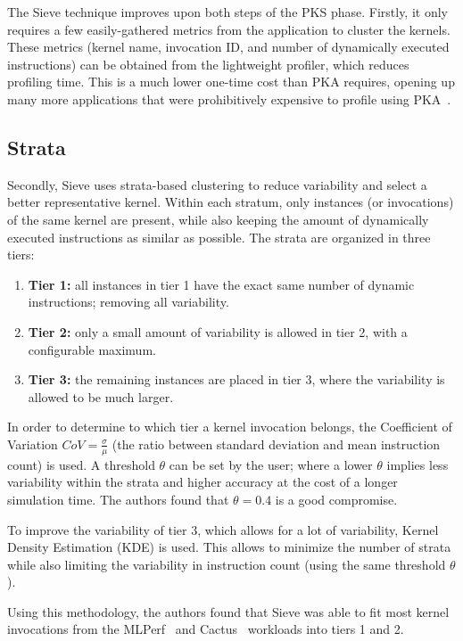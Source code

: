 The Sieve technique improves upon both steps of the PKS phase.
Firstly, it only requires a few easily-gathered metrics from the application to cluster the kernels.
These metrics (kernel name, invocation ID, and number of dynamically executed instructions) can be obtained from the lightweight profiler, which reduces profiling time.
This is a much lower one-time cost than PKA requires, opening up many more applications that were prohibitively expensive to profile using PKA\ .

\subsection{Strata}\label{subsec:strata}
Secondly, Sieve uses strata-based clustering to reduce variability and select a better representative kernel.
Within each stratum, only instances (or invocations) of the same kernel are present, while also keeping the amount of dynamically executed instructions as similar as possible.
The strata are organized in three tiers:
\begin{enumerate}
    \item \textbf{Tier 1:} all instances in tier 1 have the exact same number of dynamic instructions; removing all variability.
    \item \textbf{Tier 2:} only a small amount of variability is allowed in tier 2, with a configurable maximum.
    \item \textbf{Tier 3:} the remaining instances are placed in tier 3, where the variability is allowed to be much larger.
\end{enumerate}
In order to determine to which tier a kernel invocation belongs, the Coefficient of Variation $CoV = \frac{\sigma}{\mu}$ (the ratio between standard deviation and mean instruction count) is used.
A threshold $\theta$ can be set by the user; where a lower $\theta$ implies less variability within the strata and higher accuracy at the cost of a longer simulation time.
The authors found that $\theta = 0.4$ is a good compromise.

To improve the variability of tier 3, which allows for a lot of variability, Kernel Density Estimation (KDE) is used.
This allows to minimize the number of strata while also limiting the variability in instruction count (using the same threshold $\theta$).

Using this methodology, the authors found that Sieve was able to fit most kernel invocations from the MLPerf~\cite{mlperf} and Cactus~\cite{cactus} workloads into tiers 1 and 2.

